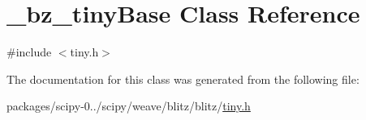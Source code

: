 \hypertarget{class__bz__tinyBase}{}\section{\+\_\+bz\+\_\+tiny\+Base Class Reference}
\label{class__bz__tinyBase}


{\ttfamily \#include $<$tiny.\+h$>$}



The documentation for this class was generated from the following file\+:\begin{DoxyCompactItemize}
\item 
packages/scipy-\/0../scipy/weave/blitz/blitz/\hyperlink{tiny_8h}{tiny.\+h}\end{DoxyCompactItemize}
